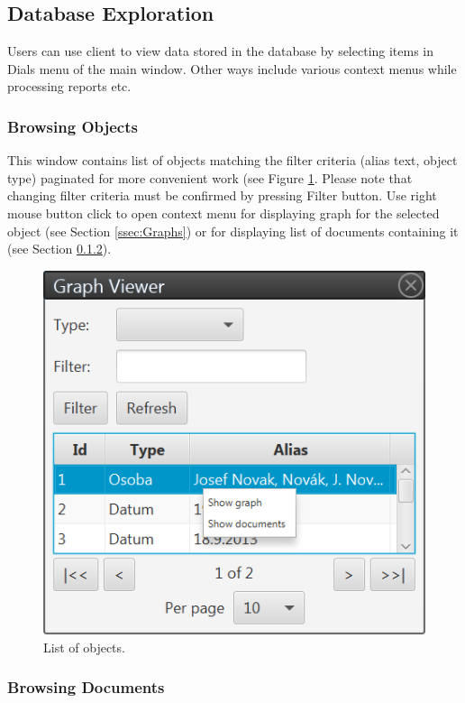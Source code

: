 \subsection{Database Exploration}
\label{ssec:ViewDatabase}

Users can use client to view data stored in the database by selecting items
in Dials menu of the main window. Other ways include various context menus
while processing reports etc.

\subsubsection{Browsing Objects}
\label{sssec:ObjectList}

This window contains list of objects matching the filter criteria (alias text,
object type) paginated for more convenient work (see Figure
\ref{fig:ObjectList}. Please note that changing filter criteria must be confirmed by pressing Filter button. Use right mouse button click to open context menu for displaying graph for the selected object (see Section \ref{ssec:Graphs}) or for displaying list of documents containing it (see
Section \ref{sssec:DocumentList}).

\begin{figure}[!htb]
        \centering
        \includegraphics{Images/objectlist}
        \caption{List of objects.}
        \label{fig:ObjectList}
\end{figure}

\subsubsection{Browsing Documents}
\label{sssec:DocumentList}

